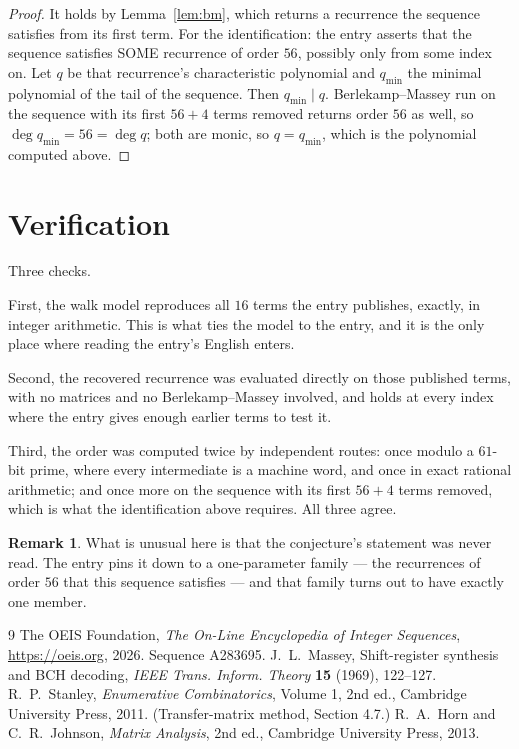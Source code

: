 \documentclass[11pt,a4paper]{article}
\theoremstyle{plain}
\theoremstyle{definition}
\newtheorem{remark}[theorem]{Remark}
\begin{document}
\begin{proof}
It holds by Lemma~\ref{lem:bm}, which returns a recurrence the sequence satisfies from its
first term. For the identification: the entry asserts that the sequence satisfies SOME
recurrence of order $56$, possibly only from some index on. Let $q$ be that recurrence's
characteristic polynomial and $q_{\min}$ the minimal polynomial of the tail of the sequence.
Then $q_{\min}\mid q$. Berlekamp--Massey run on the sequence with its first $56+4$ terms
removed returns order $56$ as well, so $\deg q_{\min}=56=\deg q$; both are monic, so
$q=q_{\min}$, which is the polynomial computed above.
\end{proof}

\section{Verification}

Three checks.

First, the walk model reproduces all $16$ terms the entry publishes, exactly, in integer
arithmetic. This is what ties the model to the entry, and it is the only place where reading
the entry's English enters.

Second, the recovered recurrence was evaluated directly on those published terms, with no
matrices and no Berlekamp--Massey involved, and holds at every index where the entry gives
enough earlier terms to test it.

Third, the order was computed twice by independent routes: once modulo a $61$-bit prime, where
every intermediate is a machine word, and once in exact rational arithmetic; and once more on
the sequence with its first $56+4$ terms removed, which is what the identification above
requires. All three agree.

\begin{remark}
What is unusual here is that the conjecture's statement was never read. The entry pins it down
to a one-parameter family --- the recurrences of order $56$ that this sequence satisfies
--- and that family turns out to have exactly one member.
\end{remark}

\begin{thebibliography}{9}
 The OEIS Foundation, \emph{The On-Line Encyclopedia of Integer
Sequences}, \url{https://oeis.org}, 2026. Sequence A283695.
 J.~L.~Massey, Shift-register synthesis and BCH decoding, \emph{IEEE
Trans. Inform. Theory} \textbf{15} (1969), 122--127.
 R.~P.~Stanley, \emph{Enumerative Combinatorics}, Volume 1, 2nd ed.,
Cambridge University Press, 2011. (Transfer-matrix method, Section 4.7.)
 R.~A.~Horn and C.~R.~Johnson, \emph{Matrix Analysis}, 2nd ed., Cambridge
University Press, 2013.
\end{thebibliography}
\end{document}
